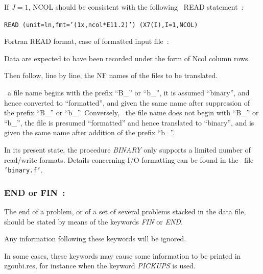 \medskip

 If $J=1$, NCOL should be consistent with the following \FORTRAN\ READ statement~: 

       {\tt     READ (unit=ln,fmt='(1x,ncol*E11.2)') (X7(I),I=1,NCOL)}

\medskip

\noindent Fortran READ format, case of formatted input file~: 

\smallskip

 Data are expected to have been recorded under the form of Ncol column rows. 
 
\bigskip

\noindent Then follow, line by line, the NF names of the files to be translated.

\medskip

\noindent \If\ a file name begins with the prefix ``B\_'' or ``b\_'', it is 
assumed ``binary'', and hence converted to ``formatted'', and given 
the same name after suppression of the prefix ``B\_'' or ``b\_''. Conversely, 
\Iff\ the file name does not begin with ``B\_'' or ``b\_'', the file is 
presumed ``formatted'' and hence translated to ``binary'', and is 
given the same name after addition of the prefix ``b\_''.

\bigskip

\noindent In its present state, the procedure \textsl{BINARY} 
only supports a limited number of read/write formats. Details concerning I/O formatting can be found 
in the \FORTRAN\ file \texttt{'binary.f'}.





\newpage

\subsubsection{END or FIN~: \ENDTitl}  \label{FIN}  \label{END} 
\medskip

The end of a problem, or of a set of several problems stacked in 
the data file, should be stated by means of the keywords \textsl{FIN} or
\textsl{END}.  

\bigskip

\noindent Any information following these keywords will be ignored. 

\bigskip

\noindent In some cases, these keywords may cause some information to be  printed in zgoubi.res, for instance when the 
keyword \textsl{PICKUPS} is used. 




